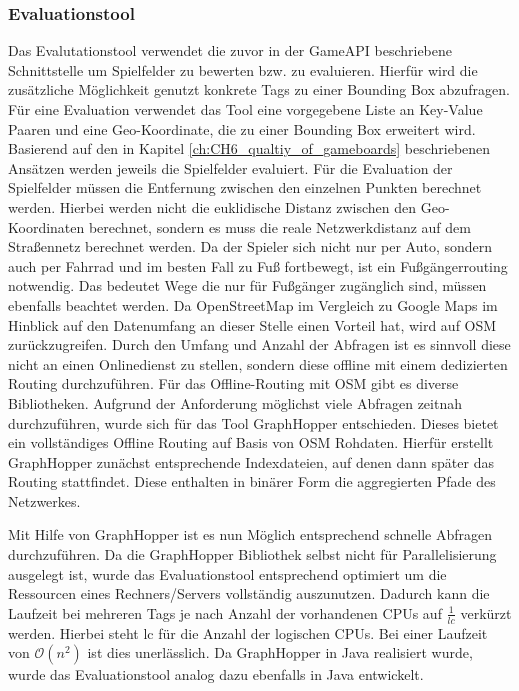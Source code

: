 \subsubsection*{Evaluationstool}

Das Evalutationstool verwendet die zuvor in der GameAPI beschriebene Schnittstelle um Spielfelder zu bewerten bzw. zu evaluieren. Hierfür wird die zusätzliche Möglichkeit genutzt konkrete Tags zu einer Bounding Box abzufragen. Für eine Evaluation verwendet das Tool eine vorgegebene Liste an Key-Value Paaren und eine Geo-Koordinate, die zu einer Bounding Box erweitert wird. Basierend auf den in Kapitel \ref{ch:CH6_qualtiy_of_gameboards} beschriebenen Ansätzen werden jeweils die Spielfelder evaluiert. Für die Evaluation der Spielfelder müssen die Entfernung zwischen den einzelnen Punkten berechnet werden. Hierbei werden nicht die euklidische Distanz zwischen den Geo-Koordinaten berechnet, sondern es muss die reale Netzwerkdistanz auf dem Straßennetz berechnet werden. Da der Spieler sich nicht nur per Auto, sondern auch per Fahrrad und im besten Fall zu Fuß fortbewegt, ist ein Fußgängerrouting notwendig. Das bedeutet Wege die nur für Fußgänger zugänglich sind, müssen ebenfalls beachtet werden. Da OpenStreetMap im Vergleich zu Google Maps im Hinblick auf den Datenumfang an dieser Stelle einen Vorteil hat, wird auf OSM zurückzugreifen. Durch den Umfang und Anzahl der Abfragen ist es sinnvoll diese nicht an einen Onlinedienst zu stellen, sondern diese offline mit einem dedizierten Routing durchzuführen. Für das Offline-Routing mit OSM gibt es diverse Bibliotheken. Aufgrund der Anforderung möglichst viele Abfragen zeitnah durchzuführen, wurde sich für das Tool GraphHopper entschieden. Dieses bietet ein vollständiges Offline Routing auf Basis von OSM Rohdaten.\cite{Karich.2014} Hierfür erstellt GraphHopper zunächst entsprechende Indexdateien, auf denen dann später das Routing stattfindet. Diese enthalten in binärer Form die aggregierten Pfade des Netzwerkes.

Mit Hilfe von GraphHopper ist es nun Möglich entsprechend schnelle Abfragen durchzuführen. Da die GraphHopper Bibliothek selbst nicht für Parallelisierung ausgelegt ist, wurde das Evaluationstool entsprechend optimiert um die Ressourcen eines Rechners/Servers vollständig auszunutzen. Dadurch kann die Laufzeit bei mehreren Tags je nach Anzahl der vorhandenen CPUs auf $\frac{1}{lc}$ verkürzt werden. Hierbei steht lc für die Anzahl der logischen CPUs. Bei einer Laufzeit von $\mathcal O(n^2)$ ist dies unerlässlich.
Da GraphHopper in Java realisiert wurde, wurde das Evaluationstool analog dazu ebenfalls in Java entwickelt.

